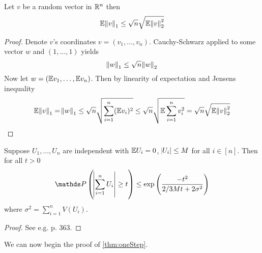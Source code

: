 \begin{prop}
  \label{lem:norm12ineq}
  Let $v$ be a random vector in $\mathbb{R}^n$ then
  \[ \mathbb{E} \norm{v}_1 \leq \sqrt{n} \sqrt{ \mathbb{E} \norm{v}_2^2 } \]
\end{prop}

\begin{proof}
  Denote $v$'s coordinates $v=(v_1, \dots, v_n)$.
  Cauchy-Schwarz applied to some vector $w$ and $(1, \dots, 1)$ yields
  \[ \norm{w}_1 \leq \sqrt{n} \norm{w}_2 \]
  Now let $w = (\mathbb{E} v_1, \dots, \mathbb{E} v_n)$.
  Then by linearity of expectation and Jensens inequality
  \[ \mathbb{E} \norm{v}_1 = \norm{w}_1 \leq \sqrt{n} \sqrt{\sum_{i=1}^n (\mathbb{E} v_i)^2}
  \leq \sqrt{n} \sqrt{\mathbb{E} \sum_{i=1}^n v_i^2} = \sqrt{n} \sqrt{\mathbb{E} \norm{v}_2^2} \]
\end{proof}

\begin{thm}
  Suppose $U_1, \dots, U_n$ are independent with $\mathbb{E} U_i = 0$, $\abs{U_i} \leq M$
  for all $i \in [n]$. Then for all $t>0$
  \[ \Prob\left(\abs{\sum_{i=1}^n U_i} \geq t\right) \leq
  \exp\left( \frac{-t^2}{2/3 M t + 2 \sigma^2} \right) \]
  where $\sigma^2 = \sum_{i=1}^n V(U_i)$.
  \label{thm:Bernstein}
\end{thm}
\begin{proof}
  See e.g.  p. 363.
\end{proof}

We can now begin the proof of \cref{thm:oneStep}.


